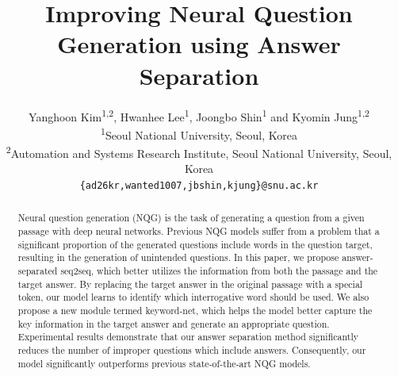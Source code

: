 \documentclass[letterpaper]{article} %
\begin{document}
%
\title{Improving Neural Question Generation using Answer Separation}
\author{Yanghoon Kim\textsuperscript{1,2}, Hwanhee Lee\textsuperscript{1}, Joongbo Shin\textsuperscript{1} and Kyomin Jung\textsuperscript{1,2}\\
  \textsuperscript{1}Seoul National University, Seoul, Korea \\
  \textsuperscript{2}Automation and Systems Research Institute, Seoul National University, Seoul, Korea\\
  {\tt \{ad26kr,wanted1007,jbshin,kjung\}@snu.ac.kr} \\
}
\maketitle
\begin{abstract}
Neural question generation (NQG) is the task of generating a question from a given passage with deep neural networks. Previous NQG models suffer from a problem that a significant proportion of the generated questions include words in the question target, resulting in the generation of unintended questions. In this paper, we propose answer-separated seq2seq, which better utilizes the information from both the passage and the target answer. By replacing the target answer in the original passage with a special token, our model learns to identify which interrogative word should be used.
We also propose a new module termed keyword-net, which helps the model better capture the key information in the target answer and generate an appropriate question. Experimental results demonstrate that our answer separation method significantly reduces the number of  improper questions which include answers. Consequently, our model significantly outperforms previous state-of-the-art NQG models.


\end{abstract}
\end{document}
